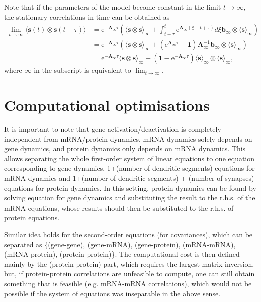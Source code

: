 \documentclass[a4paper, 11pt]{article}
\begin{document}
Note that if the parameters of the model become constant in the limit $t\to\infty$, the stationary correlations in time can be obtained as
\begin{align*}
  \lim_{t\to\infty}\langle\mathbf s(t)\otimes\mathbf s(t-\tau)\rangle &= \mathrm e^{-\mathbf A_\infty\tau}\left(\langle\mathbf s\otimes\mathbf s\rangle_\infty + \int_{t-\tau}^t\mathrm e^{\mathbf A_\infty(\xi-t+\tau)}d\xi\mathbf b_\infty\otimes\langle \mathbf s\rangle_\infty\right)\\
  &= \mathrm e^{-\mathbf A_\infty\tau}\left(\langle\mathbf s\otimes\mathbf s\rangle_\infty + \left(\mathrm e^{\mathbf A_\infty\tau}-\mathbf 1\right)\mathbf A_\infty^{-1}\mathbf b_\infty\otimes\langle \mathbf s\rangle_\infty\right)\\
  &= \mathrm e^{-\mathbf A_\infty\tau}\langle\mathbf s\otimes\mathbf s\rangle_\infty + \left(\mathbf 1 - \mathrm e^{-\mathbf A_\infty\tau}\right)\langle \mathbf s\rangle_\infty\otimes\langle \mathbf s\rangle_\infty,
\end{align*}
where $\infty$ in the subscript is equivalent to $\lim_{t\to\infty}$.

\appendix \label{app:Computational_optimisations}


\section{Computational optimisations}
It is important to note that gene activation/deactivation is completely independent from mRNA/protein dynamics, mRNA dynamics solely depends on gene dynamics, and protein dynamics only depends on mRNA dynamics. This allows separating the whole first-order system of linear equations to one equation corresponding to gene dynamics, 1+(number of dendritic segments) equations for mRNA dynamics and 1+(number of dendritic segments) + (number of synapses) equations for protein dynamics. In this setting, protein dynamics can be found by solving equation for gene dynamics and substituting the result to the r.h.s. of the mRNA equations, whose results should then be substituted to the r.h.s. of protein equations.

Similar idea holds for the second-order equations (for covariances), which can be separated as \{(gene-gene), (gene-mRNA), (gene-protein), (mRNA-mRNA), (mRNA-protein), (protein-protein)\}. The computational cost is then defined mainly by the (protein-protein) part, which requires the largest matrix inversion, but, if protein-protein correlations are unfeasible to compute, one can still obtain something that is feasible (e.g. mRNA-mRNA correlations), which would not be possible if the system of equations was inseparable in the above sense.
\end{document}
